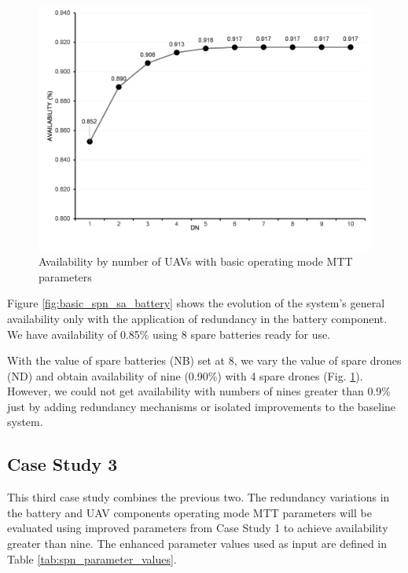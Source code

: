 \documentclass[conference]{IEEEtran}
\begin{document}
\begin{figure}[htbp]
\centerline{\includegraphics[scale=0.45]{img/exps/SA_003.png}}
\caption{Availability by number of UAVs with basic operating mode MTT parameters}
\label{fig:basic_spn_sa_uav}
\end{figure}


Figure \ref{fig:basic_spn_sa_battery} shows the evolution of the system's general availability only with the application of redundancy in the battery component. We have availability of 0.85\% using 8 spare batteries ready for use.

With the value of spare batteries (NB) set at 8, we vary the value of spare drones (ND) and obtain availability of nine (0.90\%) with 4 spare drones (Fig. \ref{fig:basic_spn_sa_uav}). However, we could not get availability with numbers of nines greater than 0.9\% just by adding redundancy mechanisms or isolated improvements to the baseline system.



\subsection{Case Study 3}\label{sec:case_studies_sub03}

This third case study combines the previous two. The redundancy variations in the battery and UAV components operating mode MTT parameters will be evaluated using improved parameters from Case Study 1 to achieve availability greater than nine. The enhanced parameter values used as input are defined in Table \ref{tab:spn_parameter_values}.
\end{document}
